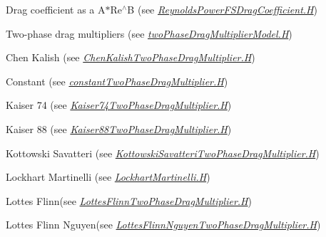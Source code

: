 \begin{DoxyItemize}
\begin{DoxyItemize}
\item Drag coefficient as a A$\ast$\+Re$^\wedge$B (see {\itshape \hyperlink{ReynoldsPowerFSDragCoefficient_8H}{Reynolds\+Power\+F\+S\+Drag\+Coefficient.\+H}}) 
\end{DoxyItemize}
\item Two-\/phase drag multipliers (see {\itshape \hyperlink{twoPhaseDragMultiplierModel_8H}{two\+Phase\+Drag\+Multiplier\+Model.\+H}}) 
\begin{DoxyItemize}
\item Chen Kalish (see {\itshape \hyperlink{ChenKalishTwoPhaseDragMultiplier_8H}{Chen\+Kalish\+Two\+Phase\+Drag\+Multiplier.\+H}}) 
\item Constant (see {\itshape \hyperlink{constantTwoPhaseDragMultiplier_8H}{constant\+Two\+Phase\+Drag\+Multiplier.\+H}}) 
\item Kaiser 74 (see {\itshape \hyperlink{Kaiser74TwoPhaseDragMultiplier_8H}{Kaiser74\+Two\+Phase\+Drag\+Multiplier.\+H}}) 
\item Kaiser 88 (see {\itshape \hyperlink{Kaiser88TwoPhaseDragMultiplier_8H}{Kaiser88\+Two\+Phase\+Drag\+Multiplier.\+H}}) 
\item Kottowski Savatteri (see {\itshape \hyperlink{KottowskiSavatteriTwoPhaseDragMultiplier_8H}{Kottowski\+Savatteri\+Two\+Phase\+Drag\+Multiplier.\+H}}) 
\item Lockhart Martinelli (see {\itshape \hyperlink{LockhartMartinelli_8H}{Lockhart\+Martinelli.\+H}}) 
\item Lottes Flinn(see {\itshape \hyperlink{LottesFlinnTwoPhaseDragMultiplier_8H}{Lottes\+Flinn\+Two\+Phase\+Drag\+Multiplier.\+H}}) 
\item Lottes Flinn Nguyen(see {\itshape \hyperlink{LottesFlinnNguyenTwoPhaseDragMultiplier_8H}{Lottes\+Flinn\+Nguyen\+Two\+Phase\+Drag\+Multiplier.\+H}}) 
\end{DoxyItemize}
\end{DoxyItemize}~\newline
 

